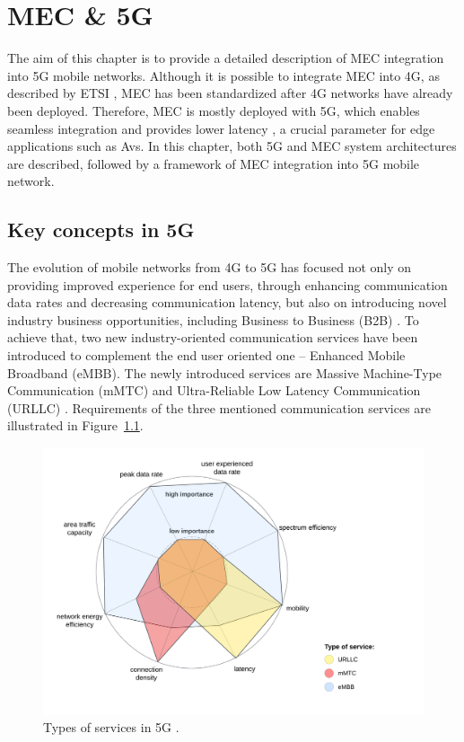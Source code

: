 \documentclass[12pt,a4paper,twoside]{report}
\begin{document}
\chapter{MEC \& 5G}
\label{Ch:MECn5G}
The aim of this chapter is to provide a detailed description of MEC integration into 5G mobile networks. Although it is possible to integrate MEC into 4G, as described by ETSI \cite{ETSI:wp24}, MEC has been standardized after 4G networks have already been deployed. Therefore, MEC is mostly deployed with 5G, which enables seamless integration \cite{ETSI:wp28} and provides lower latency \cite{dahlman-2020-5g}, a crucial parameter for edge applications such as Avs.  In this chapter, both 5G and MEC system architectures are described, followed by a framework of MEC integration into 5G mobile network.

\section{Key concepts in 5G}
The evolution of mobile networks from 4G to 5G has focused not only on providing improved experience for end users, through enhancing communication data rates and decreasing communication latency, but also on introducing novel industry business opportunities, including Business to Business (B2B) \cite{rommer20195g}. To achieve that, two new industry-oriented communication services have been introduced to complement the end user oriented one – Enhanced Mobile Broadband (eMBB). The newly introduced services are Massive Machine-Type Communication (mMTC) and Ultra-Reliable Low Latency Communication (URLLC) \cite{rommer20195g}. Requirements of the three mentioned communication services are illustrated in Figure~\ref{F:usage-scenarios}. 
\begin{figure}[ht]
	\centering
	\includegraphics[width=\textwidth]{./images/usage-scenarios.png}
	\caption{Types of services in 5G \cite{dahlman-2020-5g}.}
	\label{F:usage-scenarios}
  \end{figure}
\end{document}
